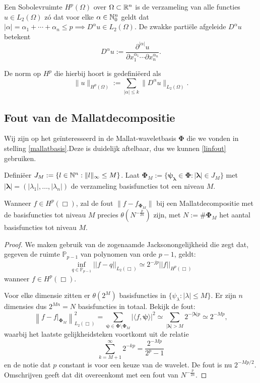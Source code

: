 \begin{definitie}[Sobolevruimte]
Een Sobolevruimte $H^p(\Omega)$ over $\Omega \subset \mathbb{R}^n$ is de verzameling van alle functies $u \in L_2(\Omega)$ z\'o dat voor elke $\alpha \in \mathbb{N}_0^n$ geldt dat $|\alpha| = \alpha_1 + \cdots + \alpha_n \leq p \implies D^\alpha u \in L_2(\Omega)$. De zwakke parti\"ele afgeleide $D^\alpha u$ betekent
\[
	D^\alpha u := \frac{\partial^{|\alpha|} u}{\partial x_1^{\alpha_1} \cdots \partial x_n^{\alpha_n} }.
\]

De norm op $H^p$ die hierbij hoort is gedefini\"eerd als
\[
	\| u \|_{H^p(\Omega)} := \sum_{|\alpha| \leq k} \| D^\alpha u \|_{L_2(\Omega)}.
\]
\end{definitie}

\subsection{Fout van de Mallatdecompositie}
Wij zijn op het ge\"interesseerd in de Mallat-waveletbasis $\boldsymbol\Phi$ die we vonden in stelling \ref{mallatbasis}.Deze is duidelijk aftelbaar, dus we kunnen \eqref{linfout} gebruiken. 

Defini\"eer $J_M := \{ l \in \mathbb{N}^n: \| l \|_\infty \leq M \}$. Laat $\boldsymbol\Phi_M := \{ \boldsymbol{\psi}_{\boldsymbol{\lambda}} \in \boldsymbol\Phi: |\boldsymbol\lambda| \in J_M \}$ met $|\boldsymbol\lambda| = (|\lambda_1|, \ldots, |\lambda_n|)$ de verzameling basisfuncties tot een niveau $M$.

\begin{stelling}
\label{thm:foutmallat}
Wanneer $f \in H^p(\Box)$, zal de fout $\| f - f_{\boldsymbol\Phi_M} \|$ bij een Mallatdecompositie met de basisfuncties tot niveau $M$ precies $\theta(N^{-\tfrac p{2n}})$ zijn, met $N := \# \boldsymbol\Phi_M$ het aantal basisfuncties tot niveau $M$.
\end{stelling}
\begin{proof}

  We maken gebruik van de zogenaamde Jacksonongelijkheid \cite{jackson} die zegt dat, gegeven de ruimte $\mathbb{P}_{p-1}$ van polynomen van orde $p-1$, geldt: 
  \[
  \inf_{q \in \mathbb{P}_{p-1}} ||f - q||_{L_2(\Box)} \simeq 2^{-jp} ||f||_{H^p(\Box)}
  \]
  wanneer $f \in H^p(\Box)$.

  Voor elke dimensie zitten er $\theta(2^M)$ basisfuncties in $\{ \psi_\lambda: |\lambda| \leq M \}$. Er zijn $n$ dimensies dus $2^{Mn} = N$ basisfuncties in totaal. Bekijk de fout:
  \[
  \left\| f - f|_{\boldsymbol\Phi_M} \right\|^2_{L_2(\Box)} 
  = \sum_{{\boldsymbol\psi} \in \boldsymbol\Phi \setminus \boldsymbol\Phi_M} | \langle f, \boldsymbol\psi \rangle |^2 
  \simeq \sum_{|\boldsymbol\lambda| > M} 2^{-|\boldsymbol\lambda|p} \simeq 2^{-Mp},
  \]
  waarbij het laatste gelijkheidsteken voortkomt uit de relatie
  \[
  \sum_{k=M+1}^\infty 2^{- kp} = \frac{2^{-Mp}}{2^p-1}
  \]
  en de notie dat $p$ constant is voor een keuze van de wavelet. 
  De fout is nu $2^{-Mp/2}$. Omschrijven geeft dat dit overeenkomt met een fout van $N^{-\frac p {2n}}$.
\end{proof}


